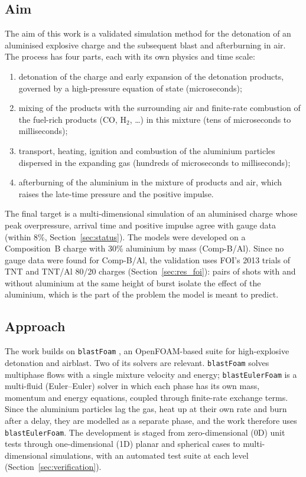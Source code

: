 \documentclass{article}
\begin{document}
\subsection{Aim}

The aim of this work is a validated simulation method for the detonation of an aluminised explosive charge and the subsequent blast and afterburning in air. The process has four parts, each with its own physics and time scale:
\begin{enumerate}
    \item detonation of the charge and early expansion of the detonation products, governed by a high-pressure equation of state (microseconds);
    \item mixing of the products with the surrounding air and finite-rate combustion of the fuel-rich products (CO, H$_2$, \dots) in this mixture (tens of microseconds to milliseconds);
    \item transport, heating, ignition and combustion of the aluminium particles dispersed in the expanding gas (hundreds of microseconds to milliseconds);
    \item afterburning of the aluminium in the mixture of products and air, which raises the late-time pressure and the positive impulse.
\end{enumerate}
The final target is a multi-dimensional simulation of an aluminised charge whose peak overpressure, arrival time and positive impulse agree with gauge data (within 8\%, Section~\ref{sec:status}). The models were developed on a Composition~B charge with 30\% aluminium by mass (Comp-B/Al). Since no gauge data were found for Comp-B/Al, the validation uses FOI's 2013 trials of TNT and TNT/Al 80/20 charges \cite{fedina2014,fedina2017} (Section~\ref{sec:res_foi}): pairs of shots with and without aluminium at the same height of burst isolate the effect of the aluminium, which is the part of the problem the model is meant to predict.

\subsection{Approach}

The work builds on \texttt{blastFoam} \cite{synthetik}, an OpenFOAM-based suite for high-explosive detonation and airblast. Two of its solvers are relevant. \texttt{blastFoam} solves multiphase flows with a single mixture velocity and energy; \texttt{blastEulerFoam} is a multi-fluid (Euler--Euler) solver in which each phase has its own mass, momentum and energy equations, coupled through finite-rate exchange terms. Since the aluminium particles lag the gas, heat up at their own rate and burn after a delay, they are modelled as a separate phase, and the work therefore uses \texttt{blastEulerFoam}. The development is staged from zero-dimensional (0D) unit tests through one-dimensional (1D) planar and spherical cases to multi-dimensional simulations, with an automated test suite at each level (Section~\ref{sec:verification}).
\end{document}
